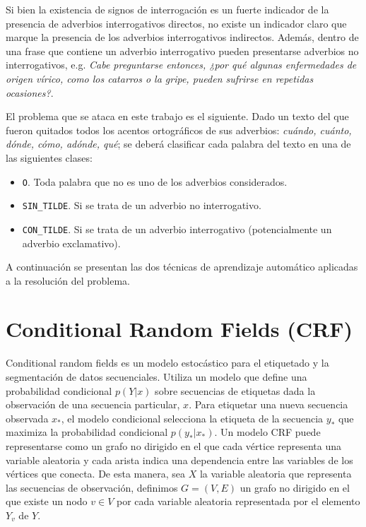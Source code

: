 \documentclass[runningheads,a4paper]{llncs}
\begin{document}
Si bien la existencia de signos de interrogación es un fuerte indicador de la presencia de adverbios interrogativos directos, no existe un indicador claro que marque la presencia de los adverbios interrogativos indirectos. Además, dentro de una frase que contiene un adverbio interrogativo pueden presentarse adverbios no interrogativos, e.g. \emph{Cabe preguntarse entonces, ¿por qué algunas enfermedades de origen vírico, como los catarros o la gripe, pueden sufrirse en repetidas ocasiones?}.

El problema que se ataca en este trabajo es el siguiente. Dado un texto del que fueron quitados todos los acentos ortográficos de sus adverbios: \emph{cuándo, cuánto, dónde, cómo, adónde, qué}; se deberá clasificar cada palabra del texto en una de las siguientes clases: 
\begin{itemize}
	\item {\texttt{O}}. Toda palabra que no es uno de los adverbios considerados.
	\item {\texttt{SIN\_TILDE}}. Si se trata de un adverbio no interrogativo.
	\item {\texttt{CON\_TILDE}}. Si se trata de un adverbio interrogativo (potencialmente un adverbio exclamativo).
\end{itemize}

A continuación se presentan las dos técnicas de aprendizaje automático aplicadas a la resolución del problema.

\section{Conditional Random Fields (CRF)}
\label{sec:CRF}

Conditional random fields\cite{LAFFERTY01} es un modelo estocástico para el etiquetado y la segmentación de datos secuenciales. Utiliza un modelo que define una probabilidad condicional $p(Y|x)$ sobre secuencias de etiquetas dada la observación de una secuencia particular, $x$. Para etiquetar una nueva secuencia observada $x_*$, el modelo condicional selecciona la etiqueta de la secuencia $y_*$ que maximiza la probabilidad condicional $p(y_*|x_*)$. Un modelo CRF puede representarse como un grafo no dirigido en el que cada vértice representa una variable aleatoria y cada arista indica una dependencia entre las variables de los vértices que conecta. De esta manera, sea $X$ la variable aleatoria que representa las secuencias de observaci\'on, definimos $G=(V,E)$ un grafo no dirigido en el que existe un nodo $v \in V$ por cada variable aleatoria representada por el elemento $Y_v$ de $Y$. 
\end{document}
